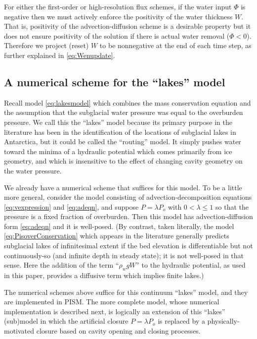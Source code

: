\documentclass[11pt,final]{amsart}
\begin{document}
For either the first-order or high-resolution flux schemes, if the water input $\Phi$ is negative then we must actively enforce the positivity of the water thickness $W$.  That is, positivity of the advection-diffusion scheme is a desirable property but it does not ensure positivity of the solution if there is actual water removal ($\Phi < 0$).  Therefore we project (reset) $W$ to be nonnegative at the end of each time step, as further explained in \eqref{eq:Wenupdate}.


\subsection*{A numerical scheme for the ``lakes'' model}  Recall model \eqref{eq:lakesmodel} which combines the mass conservation equation and the assumption that the subglacial water pressure was equal to the overburden pressure.  We call this the ``lakes'' model because its primary purpose in the literature has been in the identification of the locations of subglacial lakes in Antarctica, but it could be called the ``routing'' model.  It simply pushes water toward the minima of a hydraulic potential which comes primarily from ice geometry, and which is insensitive to the effect of changing cavity geometry on the water pressure.

We already have a numerical scheme that suffices for this model.  To be a little more general, consider the model consisting of advection-decomposition equations \eqref{eq:vexpression} and \eqref{eq:adeqn}, and suppose $P=\lambda P_o$ with $0<\lambda\le 1$ so that the pressure is a fixed fraction of overburden.  Then this model has advection-diffusion form \eqref{eq:adeqn} and it is well-posed.  (By contrast, taken literally, the model \eqref{eq:PisoverConservation} which appears in the literature generally predicts subglacial lakes of infinitesimal extent if the bed elevation is differentiable but not continuously-so (and infinite depth in steady state); it is not well-posed in that sense.  Here the addition of the term ``$\rho_w g W$'' to the hydraulic potential, as used in this paper, provides a diffusive term which implies finite lakes.)

The numerical schemes above suffice for this continuum ``lakes'' model, and they are implemented in PISM.  The more complete model, whose numerical implementation is described next, is logically an extension of this ``lakes'' (sub)model in which the artificial closure $P=\lambda P_o$ is replaced by a physically-motivated closure based on cavity opening and closing processes.
\end{document}
